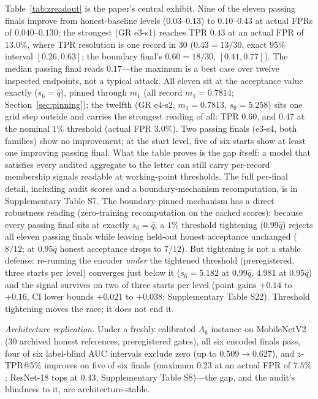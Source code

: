 \documentclass[lettersize,journal]{IEEEtran}
\begin{document}
Table~\ref{tab:zreadout} is the paper's central exhibit.
Nine of the eleven passing finals improve from honest-baseline
levels ($0.03$--$0.13$) to $0.10$--$0.43$ at actual FPRs of
$0.040$--$0.130$; the strongest (GR e3-s1) reaches TPR
$0.43$ at an actual FPR of $13.0\%$, where TPR resolution is
one record in $30$ ($0.43{=}13/30$, exact 95\% interval
$[0.26, 0.63]$; the boundary final's $0.60{=}18/30$,
$[0.41, 0.77]$). The median passing final reads $0.17$---the
maximum is a best case over twelve inspected endpoints, not a
typical attack. All eleven sit at the acceptance value exactly
($s_6{=}\hat q$), pinned through $m_1$ (all record
$m_1{=}0.7814$; Section~\ref{sec:pinning}); the twelfth
(GR e4-s2, $m_1{=}0.7813$, $s_6{=}5.258$) sits one grid step
outside and carries the strongest reading of all: TPR
$0.60$, and $0.47$ at the nominal $1\%$ threshold (actual
FPR $3.0\%$). Two passing finals (e3-s4, both families) show
no improvement; at the start level, five of six starts show
at least one improving passing final. What the table proves
is the gap itself: a model that satisfies every audited
aggregate to the letter can still carry per-record membership
signals readable at working-point thresholds. The full
per-final detail, including audit scores and a
boundary-mechanism recomputation, is in Supplementary Table
S7.
The boundary-pinned mechanism has a direct robustness reading
(zero-training recomputation on the cached scores): because
every passing final sits at exactly $s_6{=}\hat q$, a $1\%$
threshold tightening ($0.99\hat q$) rejects all eleven
passing finals while leaving held-out honest acceptance
unchanged ($8/12$; at $0.95\hat q$ honest acceptance drops to
$7/12$). But tightening is not a stable defense: re-running
the encoder \emph{under} the tightened threshold
(preregistered, three starts per level) converges just below
it ($s_6{=}5.182$ at $0.99\hat q$, $4.981$ at $0.95\hat q$)
and the signal survives on two of three starts per level
(point gains $+0.14$ to $+0.16$, CI lower bounds $+0.021$ to
$+0.038$; Supplementary Table S22). Threshold tightening
moves the race; it does not end it.

\emph{Architecture replication.} Under a freshly calibrated
$A_6$ instance on MobileNetV2 (30 archived honest references,
preregistered gates), all six encoded finals pass, four of
six label-blind AUC intervals exclude zero (up to
$0.509\to0.627$), and $z$-TPR@5\% improves on five of six
finals (maximum $0.23$ at an actual FPR of $7.5\%$; ResNet-18
tops at $0.43$; Supplementary Table S8)---the gap, and the
audit's blindness to it, are architecture-stable.
\end{document}
